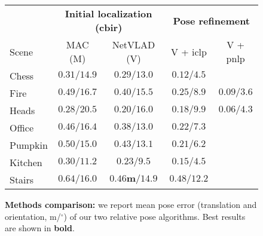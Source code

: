 \begin{figure}
\centering

\begin{footnotesize}
\renewcommand{\arraystretch}{1.1}

\begin{tabular}{l | c c | c c}
			&		\multicolumn{2}{c|}{\textbf{Initial localization (\ac{cbir})}}	&  \multicolumn{2}{c}{\textbf{Pose refinement}} \\
	Scene 	&		MAC (M)		  & NetVLAD (V)		&  V + \ac{iclp} & V + \ac{pnlp} \\
	\hline
	\hline	
	Chess 	& 	$0.31/14.9$	&	$0.29/13.0$	&	$ {0.12/4.5}$		&	\\
	Fire		& 	$0.49/16.7$	&	$0.40/15.5$	&	$ {0.25/8.9}$		& $\mathbf{0.09/3.6}$\\
	Heads	& 	$0.28/20.5$   &	$0.20/16.0$	&	$0.18/9.9$		& $\mathbf{0.06/4.3}$ \\
	Office  & 	$0.46/16.4$	&	$0.38/13.0$	&	${0.22/7.3}$		&\\
	Pumpkin & $0.50/15.0$	&	$0.43/13.1$	&	${0.21/6.2}$		&\\
	Kitchen &  $0.30/11.2$	&	$0.23/9.5$		&	${0.15/4.5}$		&\\
	Stairs  	&	$0.64/16.0$	&	$\mathbf{0.46m}/14.9$		&	$0.48/12.2$	& \\
	\hline
\end{tabular}
\end{footnotesize}

\caption[\acs{iclp} vs \ac{pnlp}]{\label{tab:methods_comparison} \textbf{Methods comparison:} we report mean pose error (translation and orientation, m/$^{\circ}$) of our two relative pose algorithms. Best results are shown in \textbf{bold}.}

\end{figure}